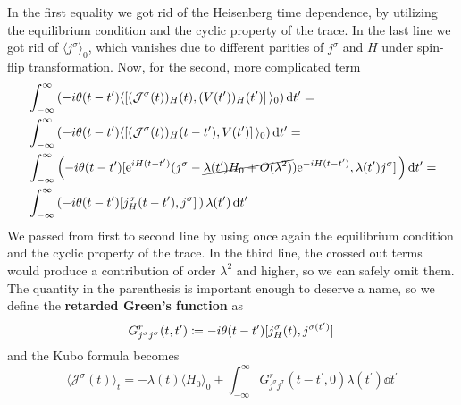 In the first equality we got rid of the Heisenberg time dependence, by utilizing the equilibrium
condition and the cyclic property of the trace. In the last line we got rid of \(\langle j^{\sigma } \rangle_0\),
which vanishes due to different parities of \(j^{\sigma }\) and \(H\) under spin-flip transformation.
Now, for the second, more complicated term
\begin{align}
     & \int_{-\infty}^{\infty }   \left(-i \theta (t-t^{\prime} ) \langle \comm*{(\mathcal{J}^{\sigma }(t))_{H}(t) }
    {(V(t^{\prime} ))_{H}(t^{\prime} )} \rangle_0 \right) \dd{t^{\prime} } = \nonumber                                                                                                                         \\
     & \int_{-\infty}^{\infty }   \left(-i \theta (t-t^{\prime} ) \langle \comm*{(\mathcal{J}^{\sigma }(t))_{H}(t-t^{\prime} ) }
    {V(t^{\prime} )} \rangle_0 \right) \dd{t^{\prime} } = \nonumber                                                                                                                                            \\
     & \int_{-\infty}^{\infty }   \left( -i \theta (t-t^{\prime} ) \comm*{\mathrm{e}^{i H(t-t^{\prime} )} (j^{\sigma } -  \cancel{\lambda (t^{\prime} )H_0 + O(\lambda ^2)}) \mathrm{e}^{-i H(t-t^{\prime} )}}
    {\lambda (t^{\prime} ) j^{\sigma }} \right) \dd{t^{\prime} }=\nonumber                                                                                                                                     \\
     & \int_{-\infty}^{\infty }   \left( -i \theta (t-t^{\prime} ) \comm*{j^{\sigma }_{H}(t-t^{\prime} )} {j^{\sigma }} \right) \lambda (t^{\prime} )\dd{t^{\prime} }
\end{align}
We passed from first to second line by using once again the equilibrium condition and the cyclic property of the trace.
In the third line, the crossed out terms would produce a contribution of order \(\lambda ^2\) and higher, so we can safely
omit them. The quantity in the parenthesis is important enough to deserve a name, so we define
the \textbf{retarded Green's function} as
\begin{equation}
    G^r_{j^{\sigma }j^{\sigma}}(t,t^{\prime} ) \coloneqq -i \theta (t-t^{\prime} ) \comm*{j^{\sigma }_{H}(t )} {j^{\sigma(t^{\prime} ) }}
\end{equation}
and the Kubo formula becomes
\begin{equation}
    \langle \mathcal{J}^{\sigma }(t) \rangle_t = -\lambda(t) \langle H_0 \rangle_0 + \int_{-\infty}^{\infty }  G^r_{j^{\sigma }j^{\sigma}}(t-t^{\prime},0 ) \lambda (t^{\prime} ) \dd{t^{\prime} } 
\end{equation}
